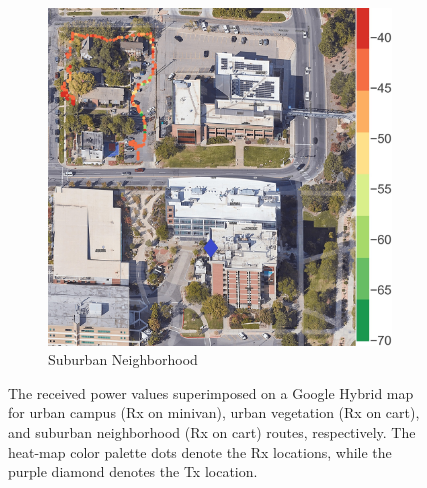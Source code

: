 \documentclass[12pt, draftcls, onecolumn]{IEEEtran}
\begin{document}
\begin{figure} [t]
\begin{subfigure}{0.2579\linewidth}
         \centering
         \includegraphics[width=1.0\linewidth]{figs/rx_suburban_fraternities.jpg}
         \caption{Suburban Neighborhood}
         \label{F5c}
     \end{subfigure}
     \vspace{-2mm}
     \caption{The received power values superimposed on a Google Hybrid map for urban campus (Rx on minivan), urban vegetation (Rx on cart), and suburban neighborhood (Rx on cart) routes, respectively. The heat-map color palette dots denote the Rx locations, while the purple diamond denotes the Tx location.}
     \label{F5}
\end{figure}
\end{document}
